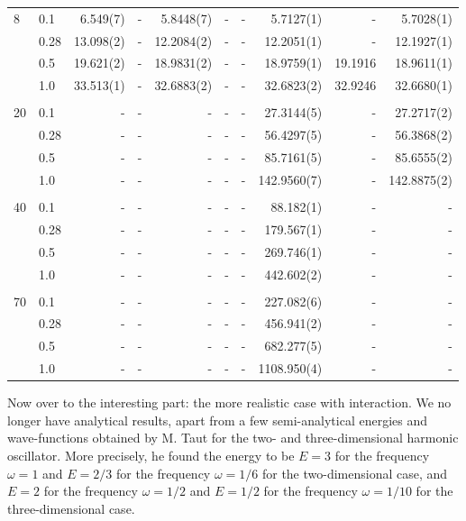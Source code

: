 \begin{landscape}
\begin{table} [H]
\begin{tabularx}{\hsize}{l:l|RRRRRRRR}
		8 & 0.1 & 6.549(7) & - & 5.8448(7) & - & - & 5.7127(1) & - & 5.7028(1) \\ 
		& 0.28 & 13.098(2) & - & 12.2084(2) & - & - & 12.2051(1) & - & 12.1927(1) \\
		& 0.5 & 19.621(2) & - & 18.9831(2) & - & - & 18.9759(1) & 19.1916 & 18.9611(1) \\
		& 1.0 & 33.513(1) & - & 32.6883(2) & - & - & 32.6823(2) & 32.9246 & 32.6680(1) \\ \hdashline \\
		
		20 & 0.1 & - & - & - & - & - & 27.3144(5) & - & 27.2717(2) \\ 
		& 0.28 & - & - & - & - & - & 56.4297(5) & - & 56.3868(2) \\
		& 0.5 & - & - & - & - & - & 85.7161(5) & - & 85.6555(2) \\
		& 1.0 & - & - & - & - & - & 142.9560(7) & - & 142.8875(2) \\ \hdashline \\
		
		40 & 0.1 & - & - & - & - & - & 88.182(1) & - & - \\ 
		& 0.28 & - & - & - & - & - & 179.567(1) & - & - \\
		& 0.5 & - & - & - & - & - & 269.746(1) & - & - \\
		& 1.0 & - & - & - & - & - & 442.602(2) & - & - \\ \hdashline \\
		
		70 & 0.1 & - & - & - & - & - & 227.082(6) & - & - \\ 
		& 0.28 & - & - & - & - & - & 456.941(2) & - & - \\
		& 0.5 & - & - & - & - & - & 682.277(5) & - & - \\
		& 1.0 & - & - & - & - & - & 1108.950(4) & - & - \\ \hline\hline
	\end{tabularx}
\end{table}
\end{landscape}

Now over to the interesting part: the more realistic case with interaction. We no longer have analytical results, apart from a few semi-analytical energies and wave-functions obtained by M. Taut for the two- and three-dimensional harmonic oscillator. More precisely, he found the energy to be $E=3$ for the frequency $\omega=1$ and $E=2/3$ for the frequency $\omega=1/6$ for the two-dimensional case, and $E=2$ for the frequency $\omega=1/2$ and $E=1/2$ for the frequency $\omega=1/10$ for the three-dimensional case. \cite{taut_two_1993}\cite{taut_two_1994}

